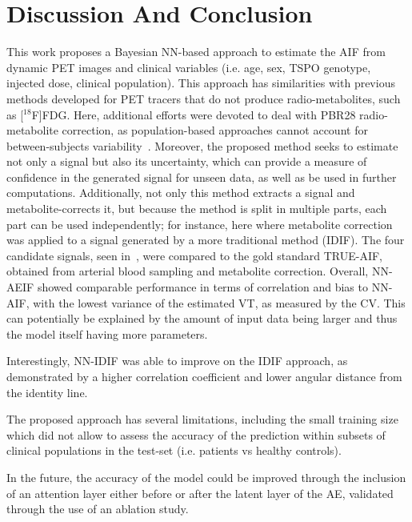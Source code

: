 \vspace{-0.5cm}

\section{Discussion And Conclusion} \label{sec:discussion}
    This work proposes a Bayesian \gls{NN}-based approach to estimate the \gls{AIF} from dynamic \gls{PET} images and clinical variables (i.e. age, sex, \gls{TSPO} genotype, injected dose, clinical population). This approach has similarities with previous methods developed for \gls{PET} tracers that do not produce radio-metabolites, such as [$^{18}$F]\gls{FDG}. Here, additional efforts were devoted to deal with \gls{PBR28} radio-metabolite correction, as population-based approaches cannot account for between-subjects variability~\cite{Mertens2021MinimallyFunction}. Moreover, the proposed method seeks to estimate not only a signal but also its uncertainty, which can provide a measure of confidence in the generated signal for unseen data, as well as be used in further computations. Additionally, not only this method extracts a signal and metabolite-corrects it, but because the method is split in multiple parts, each part can be used independently; for instance, here where metabolite correction was applied to a signal generated by a more traditional method (\gls{IDIF}).  The four candidate signals, seen in~, were compared to the gold standard TRUE-\gls{AIF}, obtained from arterial blood sampling and metabolite correction. Overall, \gls{NN}-\gls{AE}\gls{IF} showed comparable performance in terms of correlation and bias to \gls{NN}-\gls{AIF}, with the lowest variance of the estimated \gls{VT}, as measured by the \gls{CV}. This can potentially be explained by the amount of input data being larger and thus the model itself having more parameters.
    
    Interestingly, \gls{NN}-\gls{IDIF} was able to improve on the \gls{IDIF} approach, as demonstrated by a higher correlation coefficient and lower angular distance from the identity line. 
    
    The proposed approach has several limitations, including the small training size which did not allow to assess the accuracy of the prediction within subsets of clinical populations in the test-set (i.e. patients vs healthy controls). 
    
    In the future, the accuracy of the model could be improved through the inclusion of an attention layer either before or after the latent layer of the \gls{AE}, validated through the use of an ablation study. 
